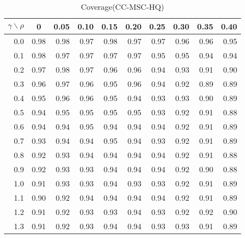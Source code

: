 \documentclass[12pt]{article}
\begin{document}
%
\begin{table}[!tbp]
\caption{Coverage(CC-MSC-HQ)}
 \begin{center}
 \begin{tabular}{r|rrrrrrrrr}\hline\hline
\multicolumn{1}{c|}{$\gamma\backslash\rho$}&\multicolumn{1}{c}{0}&\multicolumn{1}{c}{0.05}&\multicolumn{1}{c}{0.10}&\multicolumn{1}{c}{0.15}&\multicolumn{1}{c}{0.20}&\multicolumn{1}{c}{0.25}&\multicolumn{1}{c}{0.30}&\multicolumn{1}{c}{0.35}&\multicolumn{1}{c}{0.40}\tabularnewline
\hline
0.0&0.98&0.98&0.97&0.98&0.97&0.97&0.96&0.96&0.95\tabularnewline
0.1&0.98&0.97&0.97&0.97&0.97&0.95&0.95&0.94&0.94\tabularnewline
0.2&0.97&0.98&0.97&0.96&0.96&0.94&0.93&0.91&0.90\tabularnewline
0.3&0.96&0.97&0.96&0.95&0.96&0.94&0.92&0.89&0.89\tabularnewline
0.4&0.95&0.96&0.96&0.95&0.94&0.93&0.93&0.90&0.89\tabularnewline
0.5&0.94&0.95&0.95&0.95&0.95&0.93&0.92&0.91&0.88\tabularnewline
0.6&0.94&0.94&0.95&0.94&0.94&0.94&0.92&0.91&0.89\tabularnewline
0.7&0.93&0.94&0.94&0.95&0.94&0.93&0.92&0.91&0.89\tabularnewline
0.8&0.92&0.93&0.94&0.94&0.94&0.94&0.92&0.91&0.88\tabularnewline
0.9&0.92&0.93&0.93&0.94&0.94&0.94&0.92&0.90&0.88\tabularnewline
1.0&0.91&0.93&0.93&0.94&0.93&0.93&0.92&0.91&0.89\tabularnewline
1.1&0.90&0.92&0.94&0.94&0.94&0.94&0.92&0.91&0.89\tabularnewline
1.2&0.91&0.92&0.93&0.93&0.94&0.93&0.92&0.92&0.90\tabularnewline
1.3&0.91&0.92&0.93&0.94&0.94&0.93&0.93&0.91&0.89\tabularnewline
\hline
\end{tabular}

\end{center}

\end{table}
\end{document}
